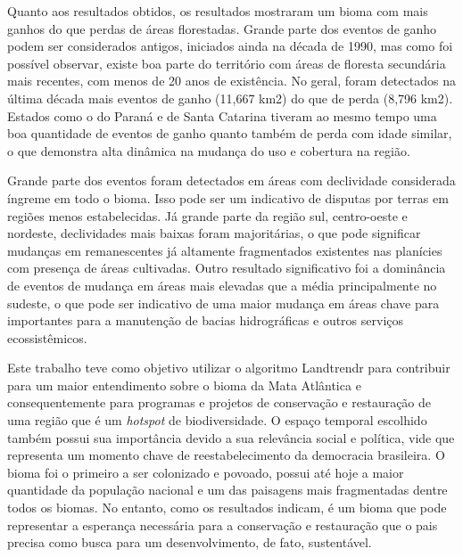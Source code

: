 Quanto aos resultados obtidos, os resultados mostraram um bioma com mais ganhos do que perdas de áreas florestadas. Grande parte dos eventos de ganho podem ser considerados antigos, iniciados ainda na década de 1990, mas como foi possível observar, existe boa parte do território com áreas de floresta secundária mais recentes, com menos de 20 anos de existência. No geral, foram detectados na última década mais eventos de ganho (11,667 km2) do que de perda (8,796 km2). Estados como o do Paraná e de Santa Catarina tiveram ao mesmo tempo uma boa quantidade de eventos de ganho quanto também de perda com idade similar, o que demonstra alta dinâmica na mudança do uso e cobertura na região.

Grande parte dos eventos foram detectados em áreas com declividade considerada íngreme em todo o bioma. Isso pode ser um indicativo de disputas por terras em regiões menos estabelecidas. Já grande parte da região sul, centro-oeste e nordeste, declividades mais baixas foram majoritárias, o que pode significar mudanças em remanescentes já altamente fragmentados existentes nas planícies com presença de áreas cultivadas. Outro resultado significativo foi a dominância de eventos de mudança em áreas mais elevadas que a média principalmente no sudeste, o que pode ser indicativo de uma maior mudança em áreas chave para importantes para a manutenção de bacias hidrográficas e outros serviços ecossistêmicos.

Este trabalho teve como objetivo utilizar o algoritmo Landtrendr para contribuir para um maior entendimento sobre o bioma da Mata Atlântica e consequentemente para programas e projetos de conservação e restauração de uma região que é um \textit{hotspot} de biodiversidade. O espaço temporal escolhido também possui sua importância devido a sua relevância social e política, vide que representa um momento chave de reestabelecimento da democracia brasileira. O bioma foi o primeiro a ser colonizado e povoado, possui até hoje a maior quantidade da população nacional e um das paisagens mais fragmentadas dentre todos os biomas. No entanto, como os resultados indicam, é um bioma que pode representar a esperança necessária para a conservação e restauração que o pais precisa como busca para um desenvolvimento, de fato, sustentável. 

